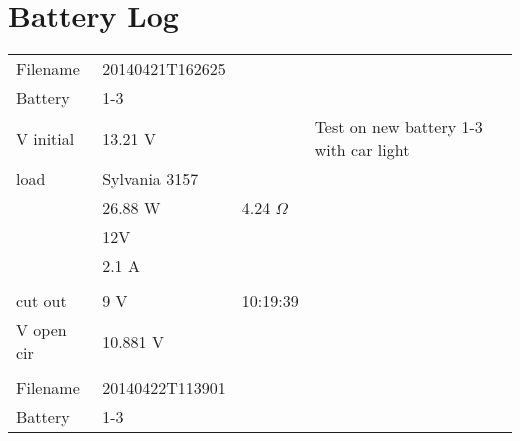 \section{Battery Log}
\label{app:BatteryLog}
\centering
\begin{longtable}{|l|l|l|p{2.5cm}|}
\hline
Filename   & 20140421T162625                &          &                                                                               \\
Battery    & 1-3                            &          &                                                                               \\
V initial  & 13.21 V                        &          & Test on new battery 1-3 with car light                                        \\
load       & Sylvania 3157                  &          &                                                                               \\
           & 26.88 W                        & 4.24 $\Omega$   &                                                                               \\
           & 12V                            &          &                                                                               \\
           & 2.1 A                          &          &                                                                               \\
           &                                &          &                                                                               \\
cut out    & 9 V                            & 10:19:39 &                                                                               \\
V open cir & 10.881 V                       &          &                                                                               \\
           &                                &          &                                                                               \\
\hline
Filename   & 20140422T113901                &          &                                                                               \\
Battery    & 1-3                            &          &                                                                               \\

\end{longtable}

